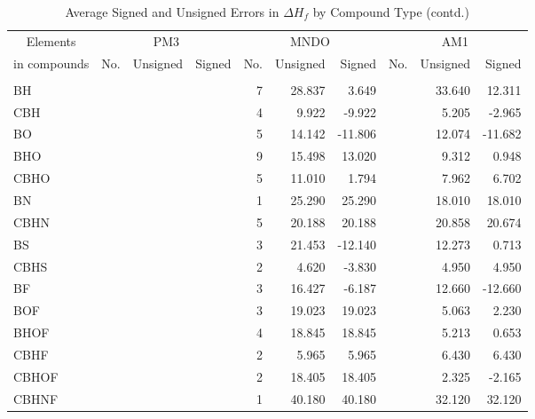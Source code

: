 \begin{table}
\caption{\label{avehofg}Average Signed and Unsigned Errors in $\Delta H_f$ by
 Compound Type (contd.)}
\compresstable
\begin{center}
\begin{tabular}{lrrrrrrrrr}
\multicolumn{1}{c}{Elements} & \multicolumn{3}{c}{PM3} & \multicolumn{3}{c}{MNDO} &
\multicolumn{3}{c}{AM1} \\
\multicolumn{1}{c}{in compounds} &  No. & Unsigned & Signed & No. & Unsigned & Signed & No. & Unsigned & Signed \\
\hline\\
  BH        &     &          &          &  7  &   28.837 &    3.649 &     &   33.640 &   12.311 \\
  CBH       &     &          &          &  4  &    9.922 &   -9.922 &     &    5.205 &   -2.965 \\
  BO        &     &          &          &  5  &   14.142 &  -11.806 &     &   12.074 &  -11.682 \\
  BHO       &     &          &          &  9 &   15.498 &   13.020 &     &    9.312 &    0.948 \\
  CBHO      &     &          &          &  5 &   11.010 &    1.794 &     &    7.962 &    6.702 \\
  BN        &     &          &          &   1 &   25.290 &   25.290 &     &   18.010 &   18.010 \\
  CBHN      &     &          &          &   5 &   20.188 &   20.188 &     &   20.858 &   20.674 \\
  BS        &     &          &          &   3 &   21.453 &  -12.140 &     &   12.273 &    0.713 \\
  CBHS      &     &          &          &   2 &    4.620 &   -3.830 &     &    4.950 &    4.950 \\
  BF        &     &          &          &   3 &   16.427 &   -6.187 &     &   12.660 &  -12.660 \\
  BOF       &     &          &          &   3 &   19.023 &   19.023 &     &    5.063 &    2.230 \\
  BHOF      &     &          &          &   4 &   18.845 &   18.845 &     &    5.213 &    0.653 \\
  CBHF      &     &          &          &   2 &    5.965 &    5.965 &     &    6.430 &    6.430 \\
  CBHOF     &     &          &          &   2 &   18.405 &   18.405 &     &    2.325 &   -2.165 \\
  CBHNF     &     &          &          &   1 &   40.180 &   40.180 &     &   32.120 &   32.120 \\

\end{tabular}
\end{center}
\end{table}

